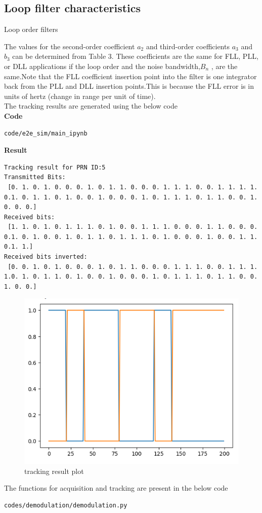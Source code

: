 \subsection{Loop filter characteristics}
\begin{table}[ht]
\centering
	\caption{\Large{Loop order filters }}
	
\end{table}

The values for the second-order coefficient $a_2$ and third-order coefficients $a_3$ and $b_3$ can be determined from Table 3. These coefficients are the same for FLL, PLL, or DLL applications if the loop
order and the noise bandwidth,$B_n$ , are the same.Note that the FLL coefficient insertion point into the filter is one integrator back from the PLL and DLL insertion points.This is because the FLL error is in units of hertz (change in range per unit of time).\\
The tracking results are generated using the below code\\
\textbf{Code}
\begin{lstlisting}
code/e2e_sim/main_ipynb
\end{lstlisting}
\textbf{Result}
\begin{lstlisting}
Tracking result for PRN ID:5
Transmitted Bits:
 [0. 1. 0. 1. 0. 0. 0. 1. 0. 1. 1. 0. 0. 0. 1. 1. 1. 0. 0. 1. 1. 1. 1. 0.1. 0. 1. 1. 0. 1. 0. 0. 1. 0. 0. 0. 1. 0. 1. 1. 1. 0. 1. 1. 0. 0. 1. 0. 0. 0.]
Received bits:
 [1. 1. 0. 1. 0. 1. 1. 1. 0. 1. 0. 0. 1. 1. 1. 0. 0. 0. 1. 1. 0. 0. 0. 0.1. 0. 1. 0. 0. 1. 0. 1. 1. 0. 1. 1. 1. 0. 1. 0. 0. 0. 1. 0. 0. 1. 1. 0.1. 1.]
Received bits inverted:
 [0. 0. 1. 0. 1. 0. 0. 0. 1. 0. 1. 1. 0. 0. 0. 1. 1. 1. 0. 0. 1. 1. 1. 1.0. 1. 0. 1. 1. 0. 1. 0. 0. 1. 0. 0. 0. 1. 0. 1. 1. 1. 0. 1. 1. 0. 0. 1. 0. 0.]
\end{lstlisting}

\begin{figure}[ht]
\includegraphics[width=0.5\columnwidth]{figs/tracking_plot.png}
\caption{tracking result plot}
\end{figure}

The functions for acquisition and tracking are present in the below code
\begin{lstlisting}
codes/demodulation/demodulation.py
\end{lstlisting}



%
